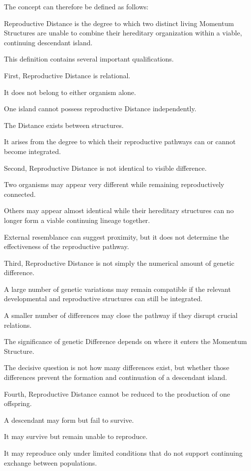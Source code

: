 The concept can therefore be defined as follows:

Reproductive Distance is the degree to which two distinct living Momentum Structures are unable to combine their hereditary organization within a viable, continuing descendant island.

This definition contains several important qualifications.

First, Reproductive Distance is relational.

It does not belong to either organism alone.

One island cannot possess reproductive Distance independently.

The Distance exists between structures.

It arises from the degree to which their reproductive pathways can or cannot become integrated.

Second, Reproductive Distance is not identical to visible difference.

Two organisms may appear very different while remaining reproductively connected.

Others may appear almost identical while their hereditary structures can no longer form a viable continuing lineage together.

External resemblance can suggest proximity, but it does not determine the effectiveness of the reproductive pathway.

Third, Reproductive Distance is not simply the numerical amount of genetic difference.

A large number of genetic variations may remain compatible if the relevant developmental and reproductive structures can still be integrated.

A smaller number of differences may close the pathway if they disrupt crucial relations.

The significance of genetic Difference depends on where it enters the Momentum Structure.

The decisive question is not how many differences exist, but whether those differences prevent the formation and continuation of a descendant island.

Fourth, Reproductive Distance cannot be reduced to the production of one offspring.

A descendant may form but fail to survive.

It may survive but remain unable to reproduce.

It may reproduce only under limited conditions that do not support continuing exchange between populations.

